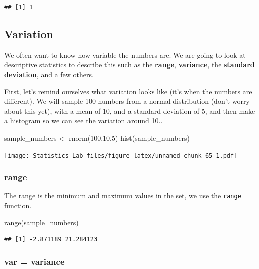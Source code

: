 \documentclass[
]{book}
\newenvironment{Shaded}{\begin{snugshade}}{\end{snugshade}}
\newcommand{\DecValTok}[1]{\textcolor[rgb]{0.00,0.00,0.81}{#1}}
\newcommand{\FunctionTok}[1]{\textcolor[rgb]{0.00,0.00,0.00}{#1}}
\newcommand{\NormalTok}[1]{#1}
\newcommand{\OtherTok}[1]{\textcolor[rgb]{0.56,0.35,0.01}{#1}}
\begin{document}
\begin{verbatim}
## [1] 1
\end{verbatim}

\hypertarget{variation}{%
\subsection{Variation}\label{variation}}

We often want to know how variable the numbers are. We are going to look at descriptive statistics to describe this such as the \textbf{range}, \textbf{variance}, the \textbf{standard deviation}, and a few others.

First, let's remind ourselves what variation looks like (it's when the numbers are different). We will sample 100 numbers from a normal distribution (don't worry about this yet), with a mean of 10, and a standard deviation of 5, and then make a histogram so we can see the variation around 10..

\begin{Shaded}
\begin{Highlighting}[]
\NormalTok{sample\_numbers }\OtherTok{\textless{}{-}} \FunctionTok{rnorm}\NormalTok{(}\DecValTok{100}\NormalTok{,}\DecValTok{10}\NormalTok{,}\DecValTok{5}\NormalTok{)}
\FunctionTok{hist}\NormalTok{(sample\_numbers)}
\end{Highlighting}
\end{Shaded}

\texttt{[image: Statistics\_Lab\_files/figure-latex/unnamed-chunk-65-1.pdf]}

\hypertarget{range}{%
\subsubsection{range}\label{range}}

The range is the minimum and maximum values in the set, we use the \texttt{range} function.

\begin{Shaded}
\begin{Highlighting}[]
\FunctionTok{range}\NormalTok{(sample\_numbers)}
\end{Highlighting}
\end{Shaded}

\begin{verbatim}
## [1] -2.871189 21.284123
\end{verbatim}

\hypertarget{var-variance}{%
\subsubsection{var = variance}\label{var-variance}}
\end{document}
